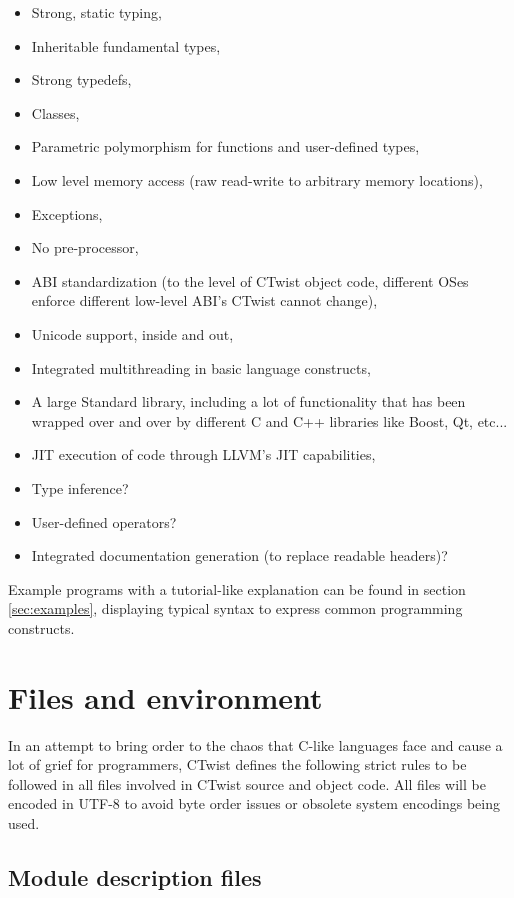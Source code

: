 \documentclass[a4paper,11pt]{article}
\begin{document}
\begin{itemize}
  \item Strong, static typing,
  \item Inheritable fundamental types,
  \item Strong typedefs,
  \item Classes,
  \item Parametric polymorphism for functions and user-defined types,
  \item Low level memory access (raw read-write to arbitrary memory locations),
  \item Exceptions,
  \item No pre-processor,
  \item ABI standardization (to the level of CTwist object code, different OSes enforce different low-level ABI’s CTwist cannot change),
  \item Unicode support, inside and out,
  \item Integrated multithreading in basic language constructs,
  \item A large Standard library, including a lot of functionality that has been wrapped over and over by different C and C++ libraries like Boost, Qt, etc...
  \item JIT execution of code through LLVM's JIT capabilities,
  \item Type inference?
  \item User-defined operators?
  \item Integrated documentation generation (to replace readable headers)?
\end{itemize}
Example programs with a tutorial-like explanation can be found in section \ref{sec:examples}, displaying typical syntax to express common programming constructs.

\section{Files and environment}

In an attempt to bring order to the chaos that C-like languages face and cause a lot of grief for programmers, CTwist defines the following strict rules to be followed in all files involved in CTwist source and object code.
All files will be encoded in UTF-8 to avoid byte order issues or obsolete system encodings being used.

  \subsection{Module description files}
\end{document}
